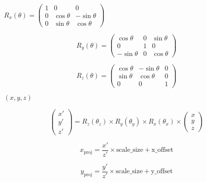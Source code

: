 \documentclass{article}
\begin{document}
$
R_x(\theta) = \begin{pmatrix}
1 & 0 & 0 \\
0 & \cos\theta & -\sin\theta \\
0 & \sin\theta & \cos\theta
\end{pmatrix}
$
\pagebreak

\[
R_y(\theta) = \begin{pmatrix}
\cos\theta & 0 & \sin\theta \\
0 & 1 & 0 \\
-\sin\theta & 0 & \cos\theta
\end{pmatrix}
\]
\pagebreak

\[
R_z(\theta) = \begin{pmatrix}
\cos\theta & -\sin\theta & 0 \\
\sin\theta & \cos\theta & 0 \\
0 & 0 & 1
\end{pmatrix}
\]
\pagebreak

$(x, y, z)$
\pagebreak

\[
\begin{pmatrix}
x' \\
y' \\
z'
\end{pmatrix}
= R_z(\theta_z) \times R_y(\theta_y) \times R_x(\theta_x) \times \begin{pmatrix}
x \\
y \\
z
\end{pmatrix}
\]
\pagebreak

\[
x_{\text{proj}} = \frac{x'}{z'} \times \text{scale\_size} + \text{x\_offset}
\]
\pagebreak

\[
y_{\text{proj}} = \frac{y'}{z'} \times \text{scale\_size} + \text{y\_offset}
\]
\pagebreak
\end{document}
